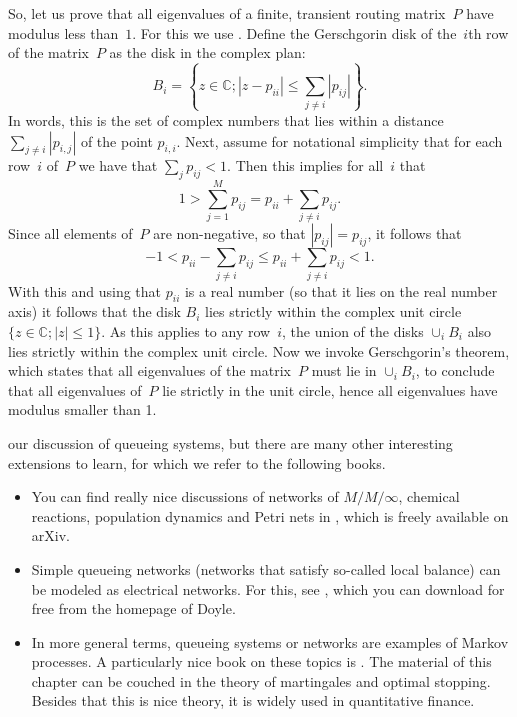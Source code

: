 \documentclass[queueing-book.tex]{subfiles}
\begin{document}
So, let us prove that all eigenvalues of a finite, transient routing matrix~$P$ have modulus less than~$1$.
For this we use .
Define the Gerschgorin disk of the~$i$th row of the matrix~$P$ as the disk in the complex plan:
\begin{equation*}
B_i=\left\{z\in \mathbb{C};  |z-p_{ii}|\leq \sum_{j\neq i} |p_{i j}| \right\}.
\end{equation*}
In words, this is the set of complex numbers that lies within a distance $\sum_{j\neq i} |p_{i,j}|$ of the point $p_{i,i}$.
Next, assume for notational simplicity that for each row~$i$ of~$P$ we have that $\sum_{j} p_{i j}<1$.
Then this implies for all~$i$ that
\begin{equation*}
1> \sum_{j=1}^M p_{i j} =  p_{ii} + \sum_{j\neq i} p_{i j}.
\end{equation*}
Since all elements of~$P$ are non-negative, so that $|p_{i j}| = p_{i j }$, it follows that
\begin{equation*}
-1 < p_{ii} - \sum_{j\neq i} p_{i j} \leq p_{ii} + \sum_{j\neq i} p_{i j} < 1.
\end{equation*}
With this and using that $p_{ii}$ is a real number (so that it lies on the real number axis) it follows that the disk $B_i $ lies strictly within the complex unit circle $\{z \in \mathbb{C}; |z|\leq 1\}$.
As this applies to any row~$i$, the union of the disks $\cup_{i} B_{i}$ also lies strictly within the complex unit circle.
Now we invoke Gerschgorin's theorem, which states that all eigenvalues of the matrix~$P$ must lie in $\cup_i B_i$, to conclude that all eigenvalues of~$P$ lie strictly in the unit circle, hence all eigenvalues have modulus smaller than 1.


 our discussion of queueing systems, but there are many other interesting extensions to learn, for which we refer to the following books.
\begin{itemize}
\item You can find really nice discussions of networks of $M/M/\infty$, chemical reactions, population dynamics and Petri nets in \cite{baez2012quantum}, which is freely available on arXiv.
\item Simple queueing networks (networks that satisfy so-called local balance) can be modeled as electrical networks.
  For this, see \cite{doyle84:_random_walks_elect_networ}, which you can download for free from the homepage of Doyle.
\item In more general terms, queueing systems or networks are examples of Markov processes.
  A particularly nice book on these topics is \cite{norris97:_markov_chain}.
  The material of this chapter can be couched in the theory of martingales and optimal stopping.
  Besides that this is nice theory, it is widely used in quantitative finance.
\end{itemize}
\end{document}
